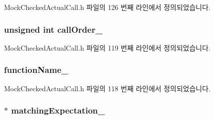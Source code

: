 Mock\+Checked\+Actual\+Call.\+h 파일의 126 번째 라인에서 정의되었습니다.

\subsubsection[{\texorpdfstring{call\+Order\+\_\+}{callOrder_}}]{\setlength{\rightskip}{0pt plus 5cm}unsigned int call\+Order\+\_\+\hspace{0.3cm}{\ttfamily [private]}}\hypertarget{class_mock_checked_actual_call_a9c2547cfdee90cd355837413e7cf0760}{}\label{class_mock_checked_actual_call_a9c2547cfdee90cd355837413e7cf0760}


Mock\+Checked\+Actual\+Call.\+h 파일의 119 번째 라인에서 정의되었습니다.

\subsubsection[{\texorpdfstring{function\+Name\+\_\+}{functionName_}}]{ function\+Name\+\_\+\hspace{0.3cm}{\ttfamily [private]}}\hypertarget{class_mock_checked_actual_call_ac33176f3607073fb4b51a445d8912ba7}{}\label{class_mock_checked_actual_call_ac33176f3607073fb4b51a445d8912ba7}


Mock\+Checked\+Actual\+Call.\+h 파일의 118 번째 라인에서 정의되었습니다.

\subsubsection[{\texorpdfstring{matching\+Expectation\+\_\+}{matchingExpectation_}}]{$\ast$ matching\+Expectation\+\_\+\hspace{0.3cm}{\ttfamily [private]}}\hypertarget{class_mock_checked_actual_call_aca733859eb143b7a7bf611a39d94d6f6}{}\label{class_mock_checked_actual_call_aca733859eb143b7a7bf611a39d94d6f6}


